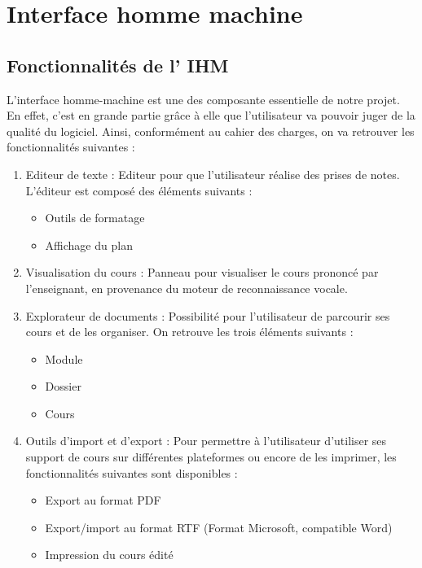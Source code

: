 
\chapter{Interface homme machine}

\section{Fonctionnalités de l' IHM}

L'interface homme-machine est une des composante essentielle de notre projet. En effet, c'est en grande partie grâce à elle que l'utilisateur va pouvoir juger de la qualité du logiciel. Ainsi, conformément au  cahier des charges, on va retrouver les fonctionnalités suivantes :

\begin{enumerate}

 \item Editeur de texte : Editeur  pour que l'utilisateur réalise des prises de notes. L'éditeur est composé des éléments suivants :
	
\begin{itemize}
 \item Outils de formatage
 \item Affichage du plan 
\end{itemize} 


\item Visualisation du cours : Panneau pour visualiser le cours prononcé par l'enseignant, en provenance du moteur de reconnaissance vocale.


 \item Explorateur de documents : Possibilité pour l'utilisateur de parcourir ses cours et de les organiser.  On retrouve les trois éléments suivants :

\begin{itemize}
 \item Module
 \item Dossier
 \item Cours
\end{itemize} 

\item Outils d'import et d'export : Pour permettre à l'utilisateur d'utiliser ses support de cours sur différentes plateformes ou encore de les imprimer, les fonctionnalités suivantes sont disponibles :

\begin{itemize}
 \item Export au format PDF
 \item Export/import au format RTF (Format Microsoft, compatible Word)
 \item Impression du cours édité
\end{itemize} 


 

\end{enumerate}



